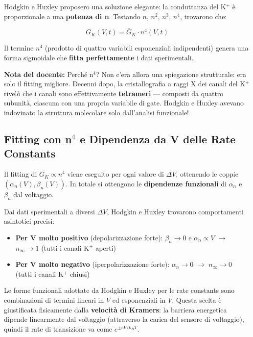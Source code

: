 Hodgkin e Huxley proposero una soluzione elegante: la conduttanza del K$^+$ è proporzionale a una \textbf{potenza di n}. Testando $n$, $n^2$, $n^3$, $n^4$, trovarono che:

\begin{equation}
G_K(V, t) = \bar{G}_K \cdot n^4(V, t)
\end{equation}

Il termine $n^4$ (prodotto di quattro variabili esponenziali indipendenti) genera una forma sigmoidale che \textbf{fitta perfettamente} i dati sperimentali.

\begin{tcolorbox}[colback=gray!5, colframe=gray!40, arc=2mm, boxrule=0.5pt]
\textbf{Nota del docente:} Perché n$^4$? Non c'era allora una spiegazione strutturale: era solo il fitting migliore. Decenni dopo, la cristallografia a raggi X dei canali del K$^+$ rivelò che i canali sono effettivamente \textbf{tetrameri} — composti da quattro subunità, ciascuna con una propria variabile di gate. Hodgkin e Huxley avevano indovinato la struttura molecolare solo dall'analisi funzionale!
\end{tcolorbox}



\subsection{Fitting con n$^4$ e Dipendenza da V delle Rate Constants}

Il fitting di $G_K \propto n^4$ viene eseguito per ogni valore di $\Delta V$, ottenendo le coppie $(\alpha_n(V), \beta_n(V))$. In totale si ottengono le \textbf{dipendenze funzionali} di $\alpha_n$ e $\beta_n$ dal voltaggio.


Dai dati sperimentali a diversi $\Delta V$, Hodgkin e Huxley trovarono comportamenti asintotici precisi:

\begin{itemize}
    \item \textbf{Per V molto positivo} (depolarizzazione forte): $\beta_n \to 0$ e $\alpha_n \propto V$ $\rightarrow$ $n_\infty \to 1$ (tutti i canali K$^+$ aperti)
    \item \textbf{Per V molto negativo} (iperpolarizzazione forte): $\alpha_n \to 0$ $\rightarrow$ $n_\infty \to 0$ (tutti i canali K$^+$ chiusi)
\end{itemize}

Le forme funzionali adottate da Hodgkin e Huxley per le rate constants sono combinazioni di termini lineari in $V$ ed esponenziali in $V$. Questa scelta è giustificata fisicamente dalla \textbf{velocità di Kramers}: la barriera energetica dipende linearmente dal voltaggio (attraverso la carica del sensore di voltaggio), quindi il rate di transizione va come $e^{\pm eV/k_BT}$.


